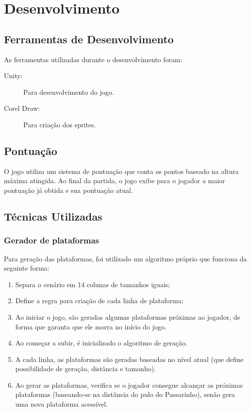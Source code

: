 \documentclass[12pt]{article}
\begin{document}
\section{Desenvolvimento}
\subsection{Ferramentas de Desenvolvimento}
	As ferramentas utilizadas durante o desenvolvimento foram:
	
	\begin{description}
		\item [Unity:] Para desenvolvimento do jogo.
		\item [Corel Draw:] Para criação dos sprites.
	\end{description}

\subsection{Pontuação}
	O jogo utiliza um sistema de pontuação que conta os pontos baseado na altura máxima atingida. Ao final da partida, o jogo exibe para o jogador a maior pontuação já obtida e sua pontuação atual.
\subsection{Técnicas Utilizadas}

\subsubsection{Gerador de plataformas}
	Para geração das plataformas, foi utilizado um algoritmo próprio que funciona da seguinte forma:
	\begin{enumerate}
		\item Separa o cenário em 14 colunas de tamanhos iguais;
		\item Define a regra para criação de cada linha de plataforma;
		\item Ao iniciar o jogo, são geradas algumas plataformas próximas ao jogador, de forma que garanta que ele morra no início do jogo.
		\item Ao começar a subir, é inicializado o algoritmo de geração.
		\item A cada linha, as plataformas são geradas baseadas no nível atual (que define possibilidade de geração, distância e tamanho).		
		\item Ao gerar as plataformas, verifica se o jogador consegue alcançar as próximas plataformas (baseando-se na distância do pulo do Passarinho), senão gera uma nova plataforma acessível.
	\end{enumerate}
\end{document}
